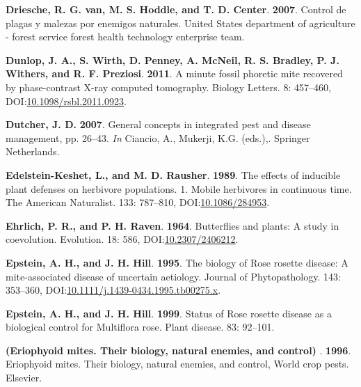 \documentclass[12pt,final,CPage]{ufthesis}
\newlength{\cslhangindent}
\newenvironment{CSLReferences}[2] %
{%
	\setlength{\parindent}{0pt}
	\ifodd #1 \everypar{\setlength{\hangindent}{\cslhangindent}}\ignorespaces\fi
	\ifnum #2 > 0
	\setlength{\parskip}{#2\baselineskip}
	\fi
}%
{}
\begin{document}
{\begin{CSLReferences}{1}{0}
  \leavevmode{}%
  \textbf{Driesche, R. G. van, M. S. Hoddle, and T. D. Center}. \textbf{2007}. Control de plagas y malezas por enemigos naturales. {United States} department of agriculture - forest service forest health technology enterprise team.

  \leavevmode{}%
  \textbf{Dunlop, J. A., S. Wirth, D. Penney, A. McNeil, R. S. Bradley, P. J. Withers, and R. F. Preziosi}. \textbf{2011}. A minute fossil phoretic mite recovered by phase-contrast {X-ray} computed tomography. Biology Letters. 8: 457--460, DOI:\href{https://doi.org/10.1098/rsbl.2011.0923}{10.1098/rsbl.2011.0923}.

  \leavevmode{}%
  \textbf{Dutcher, J. D.} \textbf{2007}. General concepts in integrated pest and disease management, pp. 26--43. \emph{In} Ciancio, A., Mukerji, K.G. (eds.),. Springer Netherlands.

  \leavevmode{}%
  \textbf{Edelstein-Keshet, L., and M. D. Rausher}. \textbf{1989}. The effects of inducible plant defenses on herbivore populations. 1. Mobile herbivores in continuous time. The American Naturalist. 133: 787--810, DOI:\href{https://doi.org/10.1086/284953}{10.1086/284953}.

  \leavevmode{}%
  \textbf{Ehrlich, P. R., and P. H. Raven}. \textbf{1964}. Butterflies and plants: A study in coevolution. Evolution. 18: 586, DOI:\href{https://doi.org/10.2307/2406212}{10.2307/2406212}.

  \leavevmode{}%
  \textbf{Epstein, A. H., and J. H. Hill}. \textbf{1995}. The biology of {Rose rosette disease}: A mite-associated disease of uncertain aetiology. Journal of Phytopathology. 143: 353--360, DOI:\href{https://doi.org/10.1111/j.1439-0434.1995.tb00275.x}{10.1111/j.1439-0434.1995.tb00275.x}.

  \leavevmode{}%
  \textbf{Epstein, A. H., and J. H. Hill}. \textbf{1999}. Status of {Rose rosette disease} as a biological control for {Multiflora rose}. Plant disease. 83: 92--101.

  \leavevmode{}%
  \textbf{(Eriophyoid mites. Their biology, natural enemies, and control) }. \textbf{1996}. Eriophyoid mites. Their biology, natural enemies, and control, World crop pests. Elsevier.


\end{CSLReferences}}
\end{document}
